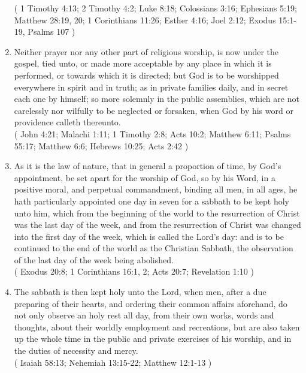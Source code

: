 \documentclass[12pt,a4paper]{book}
\begin{document}
\begin{enumerate}
( 1 Timothy 4:13; 2 Timothy 4:2; Luke 8:18; Colossians 3:16; Ephesians 5:19; Matthew 28:19, 20; 1 Corinthians 11:26; Esther 4:16; Joel 2:12; Exodus 15:1-19, Psalms 107 )
\item
\label{ch-rel-wor-6}
Neither prayer nor any other part of religious worship, is now under the gospel, tied unto, or made more acceptable by any place in which it is performed, or towards which it is directed; but God is to be worshipped everywhere in spirit and in truth; as in private families daily, and in secret each one by himself; so more solemnly in the public assemblies, which are not carelessly nor wilfully to be neglected or forsaken, when God by his word or providence calleth thereunto.\\
( John 4:21; Malachi 1:11; 1 Timothy 2:8; Acts 10:2; Matthew 6:11; Psalms 55:17; Matthew 6:6; Hebrews 10:25; Acts 2:42 )
\item
\label{ch-rel-wor-7}
As it is the law of nature, that in general a proportion of time, by God's appointment, be set apart for the worship of God, so by his Word, in a positive moral, and perpetual commandment, binding all men, in all ages, he hath particularly appointed one day in seven for a sabbath to be kept holy unto him, which from the beginning of the world to the resurrection of Christ was the last day of the week, and from the resurrection of Christ was changed into the first day of the week, which is called the Lord's day: and is to be continued to the end of the world as the Christian Sabbath, the observation of the last day of the week being abolished.\\
( Exodus 20:8; 1 Corinthians 16:1, 2; Acts 20:7; Revelation 1:10 )
\item
\label{ch-rel-wor-8}
The sabbath is then kept holy unto the Lord, when men, after a due preparing of their hearts, and ordering their common affairs aforehand, do not only observe an holy rest all day, from their own works, words and thoughts, about their worldly employment and recreations, but are also taken up the whole time in the public and private exercises of his worship, and in the duties of necessity and mercy.\\
( Isaiah 58:13; Nehemiah 13:15-22; Matthew 12:1-13 )
\end{enumerate}
\end{document}
